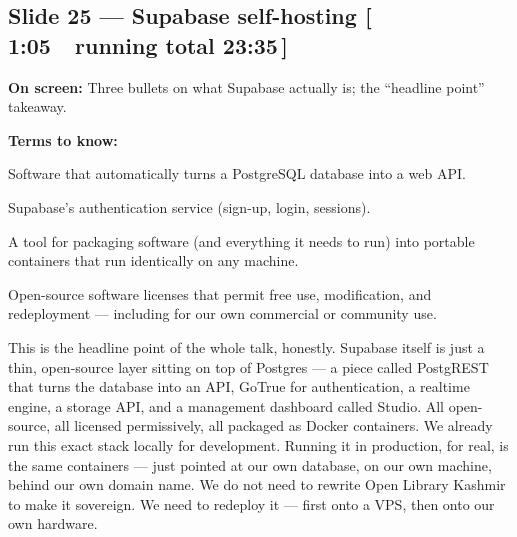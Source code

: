 \documentclass[11pt]{article}
\newcommand{\onscreen}[1]{\noindent\textbf{\color{sovGrey}On screen:} #1\par\vspace{4pt}}
\newcommand{\timing}[2]{\hfill{\normalsize\color{sovGrey}[\,#1\ \textbar\ running total #2\,]}}
\newenvironment{terms}
  {\noindent\textbf{\color{sovGrey}Terms to know:}
   \begin{description}[leftmargin=0pt,style=sameline,labelindent=0pt,itemsep=2pt,topsep=2pt,font=\normalfont\bfseries\color{sovDark}]}
  {\end{description}\vspace{2pt}}
\begin{document}
\subsection*{Slide 25 --- Supabase self-hosting \timing{1:05}{23:35}}
\onscreen{Three bullets on what Supabase actually is; the ``headline point'' takeaway.}
\begin{terms}
  \item[PostgREST] Software that automatically turns a PostgreSQL database into a
    web API.
  \item[GoTrue] Supabase's authentication service (sign-up, login, sessions).
  \item[Docker] A tool for packaging software (and everything it needs to run) into
    portable containers that run identically on any machine.
  \item[Apache / MIT license] Open-source software licenses that permit free use,
    modification, and redeployment --- including for our own commercial or community
    use.
\end{terms}
\begin{sayit}
This is the headline point of the whole talk, honestly. Supabase itself is just a thin,
open-source layer sitting on top of Postgres --- a piece called PostgREST that turns the
database into an API, GoTrue for authentication, a realtime engine, a storage API, and a
management dashboard called Studio. All open-source, all licensed permissively, all
packaged as Docker containers. We already run this exact stack locally for development.
Running it in production, for real, is the same containers --- just pointed at our own
database, on our own machine, behind our own domain name. We do not need to rewrite Open
Library Kashmir to make it sovereign. We need to redeploy it --- first onto a VPS, then
onto our own hardware.
\end{sayit}
\end{document}
